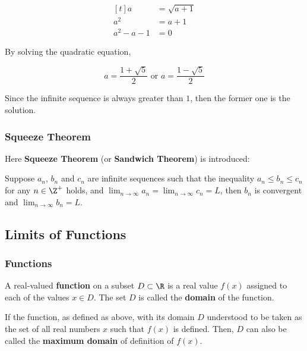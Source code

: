 \begin{exm}
\begin{alist}
   $$\begin{aligned}[t]
     a&=\sqrt{a+1}\\
     a^{2}&=a+1\\
     a^{2}-a-1&=0
   \end{aligned}$$\s

   By solving the quadratic equation,

   $$a=\frac{1+\sqrt{5}}{2}\text{ or }a=\frac{1-\sqrt{5}}{2}$$\s

   Since the infinite sequence is always greater than $1$, then the former one is the solution.
   \end{alist}
\end{exm}

\subsubsection{Squeeze Theorem}
Here \textbf{Squeeze Theorem} (or \textbf{Sandwich Theorem}) is introduced:\n

\begin{thm}
  Suppose $a_{n}$, $b_{n}$ and $c_{n}$ are infinite sequences such that the inequality $a_{n}\leq b_{n}\leq c_{n}$ for any $n\in \Z^{+}$ holds, and $\lim_{n\to \infty}a_{n}=\lim_{n\to \infty}c_{n}=L$, then $b_{n}$ is convergent and $\lim_{n\to \infty}b_{n}=L$.
\end{thm}

\subsection{Limits of Functions}
\subsubsection{Functions}
\begin{dft}
  A real-valued \textbf{function} on a subset $D\subset \R$ is a real value $f(x)$ assigned to each of the values $x\in D$. The set $D$ is called the \textbf{domain} of the function.\n

  If the function, as defined as above, with its domain $D$ understood to be taken as the set of all real numbers $x$ such that $f(x)$ is defined. Then, $D$ can also be called the \textbf{maximum domain} of definition of $f(x)$.
\end{dft}

